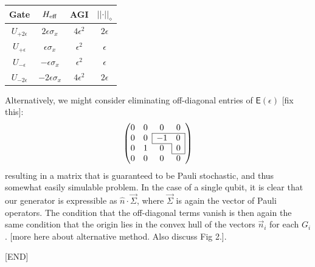 \documentclass[aps,nofootinbib,pra,notitlepage,twocolumn]{revtex4-1}
\newcommand{\tr}{{\rm Tr\thinspace}}
\newcommand{\note}[1]{{\color{red}[#1]}}
\newcommand{\error}{\ensuremath{{\mathsf{E}}}}
\begin{document}
\begin{center}
\begin{tabular}{cccc}
	Gate & $H_{\rm{eff}}$ & AGI & $\vert\vert\cdot\vert\vert_\diamond$ \\
\hline
	$U_{+2\epsilon}$ & $2\epsilon \sigma_x$ & $4\epsilon^2$ & $2\epsilon$\\
	$U_{+\epsilon}$ & $\epsilon \sigma_x$ & $\epsilon^2$ & $\epsilon$ \\
	$U_{-\epsilon}$ & $-\epsilon \sigma_x$ & $\epsilon^2$ & $\epsilon$ \\
	$U_{-2\epsilon}$ & $-2\epsilon \sigma_x$ & $4\epsilon^2$ & $2\epsilon$ 
\end{tabular}
\end{center}

Alternatively, we might consider eliminating off-diagonal entries of $\error(\epsilon)$ \note{fix this}:
\begin{equation}
	\left(\begin{array}{@{}ccccc@{}}
		0 & 0 & 0 & 0 \\ 
  		\cline{3-4}
    	0 & 0 & \multicolumn{1}{|c}{-1} & \multicolumn{1}{c|}{0} \\
    	\cline{3-3}		
		0 & 1 & 0 & \multicolumn{1}{|c|}{0}\\
		\cline{4-4}	
		0 & 0 & 0 & 0
	\end{array} 	
	\right)
\end{equation}
 resulting in a matrix that is guaranteed to be Pauli stochastic, and thus somewhat easily simulable problem. In the case of a single qubit, it is clear that our generator is expressible as $\hat{n}\cdot\vec{\Sigma}$, where $\vec{\Sigma}$ is again the vector of Pauli operators. The condition that the off-diagonal terms vanish is then again the same condition that the origin lies in the convex hull of the vectors $\vec{n}_i$ for each $G_i$.
 \note{more here about alternative method. Also discuss Fig 2.}. 


\note{END}


\end{document}
